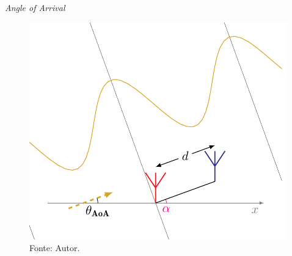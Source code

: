     \begin{frame}{\textit{Angle of Arrival}}
        \begin{figure}
            \centering
            \caption*{$ \theta_\text{AoA}=\SI{20}{\degree} $, $\textcolor{cmyk_M}{\alpha_{k}}=\SI{20}{\degree}$, $ \textcolor{Purple}{\beta_{\pm k}} = \SI{0}{\degree} $}
            \includegraphics{../pictures/AoA_4}
            \caption*{ \tiny Fonte: Autor.}
        \end{figure}
    \end{frame}

